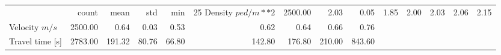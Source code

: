 \begin{tabular}{lrrrrrrrr}
\toprule
 & count & mean & std & min & 25%
\midrule
Density $ped/m**2$ & 2500.00 & 2.03 & 0.05 & 1.85 & 2.00 & 2.03 & 2.06 & 2.15 \\
Velocity $m/s$ & 2500.00 & 0.64 & 0.03 & 0.53 & 0.62 & 0.64 & 0.66 & 0.76 \\
Travel time [s] & 2783.00 & 191.32 & 80.76 & 66.80 & 142.80 & 176.80 & 210.00 & 843.60 \\
\bottomrule
\end{tabular}
